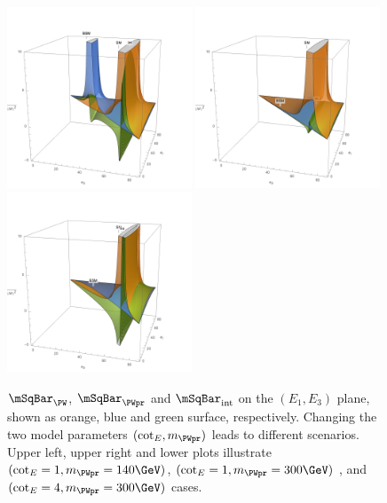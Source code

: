 \begin{figure}[ht]
    \centering
    \includegraphics[width=0.49\textwidth]{chapters/Physics/sectionBSM/figures/WPrime_140_1.png}
    \includegraphics[width=0.49\textwidth]{chapters/Physics/sectionBSM/figures/WPrime_300_1.png}
    \includegraphics[width=0.49\textwidth]{chapters/Physics/sectionBSM/figures/WPrime_300_4.png}
    \caption{ $\mSqBar _{\PW}$, $\mSqBar _{\PWpr} $ and $\mSqBar _{\mathrm{int}}$ on the $(E_1,E_3)$ plane, shown as orange, blue and green surface, respectively. Changing the two model parameters $(\cot_E, m_{\PWpr})$ leads to different scenarios. Upper left, upper right and lower plots illustrate  $(\cot_E=1, m_{\PWpr}=140  \GeV )$, $(\cot_E=1, m_{\PWpr}=300  \GeV )$ , and $(\cot_E=4, m_{\PWpr}=300  \GeV )$ cases. }
    \label{fig:physics:bsm:WPrime:m2}
\end{figure}



